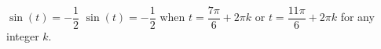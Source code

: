 {$\sin(t) = -\dfrac{1}{2}$}
{$\sin(t) = -\dfrac{1}{2}$ when $t = \dfrac{7\pi}{6} + 2\pi k$ or $t = \dfrac{11\pi}{6} + 2\pi k$ for any integer $k$.}
